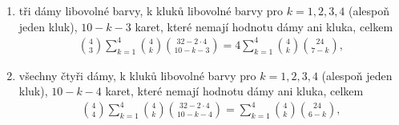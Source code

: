 \begin{mdframed}[style=mdexam]
\begin{example}
\begin{enumerate}[leftmargin=10pt,noitemsep]
        \item tři dámy libovolné barvy, k kluků libovolné barvy pro \(k = 1, 2, 3, 4\) (alespoň
              jeden kluk), \(10 - k - 3\) karet, které nemají hodnotu dámy ani kluka, celkem
              \begin{gather*}
                \binom{4}{3}\sum^{4}_{k=1}\binom{4}{k}\binom{32 - 2\cdot4}{10 - k - 3} =
                           4\sum^{4}_{k=1}\binom{4}{k}\binom{24}{7 - k},
              \end{gather*}
        \item všechny čtyři dámy, k kluků libovolné barvy pro \(k = 1, 2, 3, 4\) (alespoň jeden
              kluk), \(10 - k - 4\) karet, které nemají hodnotu dámy ani kluka, celkem
              \begin{gather*}
                \binom{4}{4}\sum^{4}_{k=1}\binom{4}{k}\binom{32 - 2\cdot4}{10 - k - 4} =
                            \sum^{4}_{k=1}\binom{4}{k}\binom{24}{6 - k},
              \end{gather*}
      \end{enumerate}
      

\end{example}
\end{mdframed}
